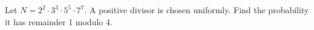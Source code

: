 Let $N=2^2\cdot3^3\cdot5^5\cdot7^7$. A positive divisor is chosen uniformly. Find the probability it has remainder 1 modulo 4.
